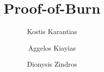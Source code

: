 \title{Proof-of-Burn}
\ifanonymous{\iflncs
\author{}\institute{}
\fi}
\else
   \author{
           Kostis Karantias  \and
           Aggelos Kiayias  \and
           Dionysis Zindros 
   }
\fi

\iflncs
\maketitle
\fi
